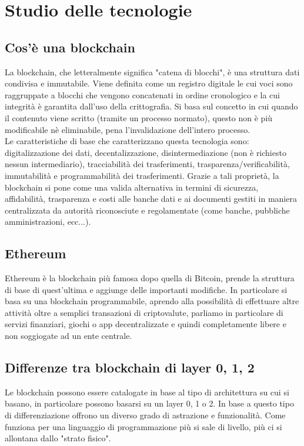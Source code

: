 \section{Studio delle tecnologie}

\subsection{Cos'è una blockchain}
La blockchain, che letteralmente significa "catena di blocchi", è una struttura dati condivisa e
immutabile. Viene definita come un registro digitale le cui voci sono raggruppate a blocchi che
vengono concatenati in ordine cronologico e la cui integrità è garantita dall'uso della crittografia.
Si basa sul concetto in cui quando il contenuto viene scritto (tramite un processo normato), questo non
è più modificabile nè eliminabile, pena l'invalidazione dell'intero processo.\\
Le caratteristiche di base che caratterizzano questa tecnologia sono: digitalizzazione dei dati, decentalizzazione,
disintermediazione (non è richiesto nessun intermediario), tracciabilità dei trasferimenti, trasparenza/verificabilità,
immutabilità e programmabilità dei trasferimenti. Grazie a tali proprietà, la blockchain si pone come una valida
alternativa in termini di sicurezza, affidabilità, trasparenza e costi alle banche dati e ai documenti gestiti in maniera
centralizzata da autorità riconosciute e regolamentate (come banche, pubbliche amministrazioni, ecc...).

\subsection{Ethereum}
Ethereum è la blockchain più famosa dopo quella di Bitcoin, prende la struttura di base di quest'ultima e aggiunge delle
importanti modifiche. In particolare si basa su una blockchain programmabile, aprendo alla possibilità di effettuare altre attività
oltre a semplici transazioni di criptovalute, parliamo in particolare di servizi finanziari, giochi o app decentralizzate e quindi
completamente libere e non soggiogate ad un ente centrale.

\subsection{Differenze tra blockchain di layer 0, 1, 2}
Le blockchain possono essere catalogate in base al tipo di architettura su cui si basano, in particolare possono basarsi su un layer 0, 1 o 2.
In base a questo tipo di differenziazione offrono un diverso grado di astrazione e funzionalità. Come funziona per una linguaggio di programmazione
più si sale di livello, più ci si allontana dallo "strato fisico".
    
